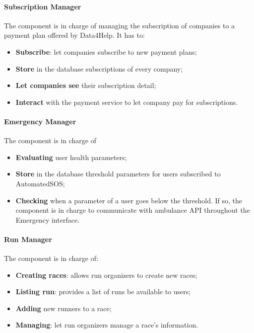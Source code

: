 \paragraph{Subscription Manager} \mbox{} \newline
The component is in charge of managing the subscription of companies to a payment plan offered by Data4Help.
It has to:
\begin{itemize}
    \item \textbf{Subscribe}: let companies subscribe to new payment plans;
    \item \textbf{Store} in the database subscriptions of every company;
    \item \textbf{Let companies see} their subscription detail;
    \item \textbf{Interact} with the payment service to let company pay for subscriptions.
\end{itemize}



\paragraph{Emergency Manager} 
\mbox{} \newline
The component is in charge of 
\begin{itemize}
    \item \textbf{Evaluating} user health parameters;
    \item \textbf{Store} in the database threshold parameters for users subscribed to AutomatedSOS;
    \item \textbf{Checking} when a parameter of a user goes below the threshold. If so, the component is in charge to communicate with ambulance API throughout the Emergency interface.
\end{itemize}


\paragraph{Run Manager} \mbox{} \newline
The component is in charge of:
\begin{itemize}
    \item \textbf{Creating races}: allows run organizers to create new races;
    \item \textbf{Listing run}: provides a list of runs be available to users;
    \item \textbf{Adding} new runners to a race;
    \item \textbf{Managing}: let run organizers manage a race's information.
\end{itemize}


